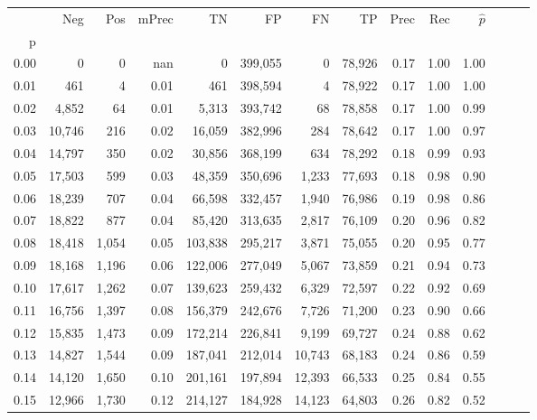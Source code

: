 \begin{tabular}{rrrrrrrrrrrrrr}
\toprule
{} &     Neg &    Pos & mPrec &       TN &       FP &      FN &      TP &  Prec &   Rec & $\hat{p}$ \\
p    &         &        &       &          &          &         &         &       &       &           \\
\midrule
0.00 &       0 &      0 &   nan &        0 &  399,055 &       0 &  78,926 &  0.17 &  1.00 &      1.00 \\
0.01 &     461 &      4 &  0.01 &      461 &  398,594 &       4 &  78,922 &  0.17 &  1.00 &      1.00 \\
0.02 &   4,852 &     64 &  0.01 &    5,313 &  393,742 &      68 &  78,858 &  0.17 &  1.00 &      0.99 \\
0.03 &  10,746 &    216 &  0.02 &   16,059 &  382,996 &     284 &  78,642 &  0.17 &  1.00 &      0.97 \\
0.04 &  14,797 &    350 &  0.02 &   30,856 &  368,199 &     634 &  78,292 &  0.18 &  0.99 &      0.93 \\
0.05 &  17,503 &    599 &  0.03 &   48,359 &  350,696 &   1,233 &  77,693 &  0.18 &  0.98 &      0.90 \\
0.06 &  18,239 &    707 &  0.04 &   66,598 &  332,457 &   1,940 &  76,986 &  0.19 &  0.98 &      0.86 \\
0.07 &  18,822 &    877 &  0.04 &   85,420 &  313,635 &   2,817 &  76,109 &  0.20 &  0.96 &      0.82 \\
0.08 &  18,418 &  1,054 &  0.05 &  103,838 &  295,217 &   3,871 &  75,055 &  0.20 &  0.95 &      0.77 \\
0.09 &  18,168 &  1,196 &  0.06 &  122,006 &  277,049 &   5,067 &  73,859 &  0.21 &  0.94 &      0.73 \\
0.10 &  17,617 &  1,262 &  0.07 &  139,623 &  259,432 &   6,329 &  72,597 &  0.22 &  0.92 &      0.69 \\
0.11 &  16,756 &  1,397 &  0.08 &  156,379 &  242,676 &   7,726 &  71,200 &  0.23 &  0.90 &      0.66 \\
0.12 &  15,835 &  1,473 &  0.09 &  172,214 &  226,841 &   9,199 &  69,727 &  0.24 &  0.88 &      0.62 \\
0.13 &  14,827 &  1,544 &  0.09 &  187,041 &  212,014 &  10,743 &  68,183 &  0.24 &  0.86 &      0.59 \\
0.14 &  14,120 &  1,650 &  0.10 &  201,161 &  197,894 &  12,393 &  66,533 &  0.25 &  0.84 &      0.55 \\
0.15 &  12,966 &  1,730 &  0.12 &  214,127 &  184,928 &  14,123 &  64,803 &  0.26 &  0.82 &      0.52 \\

\end{tabular}
